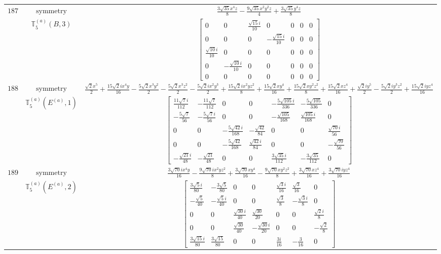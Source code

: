 \documentclass[fleqn,8pt,landscape]{jsarticle}
\begin{document}
\begin{longtable}{ccc}
$ 187 $ & $ \text{symmetry} $ & $ \frac{3 \sqrt{35} x^{4} z}{8} - \frac{9 \sqrt{35} x^{2} y^{2} z}{4} + \frac{3 \sqrt{35} y^{4} z}{8} $ \\
$  $ & $ \mathbb{T}_{5}^{(a)}(B,3) $ & $ \begin{bmatrix} 0 & 0 & \frac{\sqrt{15} i}{10} & 0 & 0 & 0 & 0 \\ 0 & 0 & 0 & - \frac{\sqrt{15} i}{10} & 0 & 0 & 0 \\ \frac{\sqrt{10} i}{10} & 0 & 0 & 0 & 0 & 0 & 0 \\ 0 & - \frac{\sqrt{10} i}{10} & 0 & 0 & 0 & 0 & 0 \\ 0 & 0 & 0 & 0 & 0 & 0 & 0 \end{bmatrix} $ \\ \hline
$ 188 $ & $ \text{symmetry} $ & $ \frac{\sqrt{2} x^{5}}{2} + \frac{15 \sqrt{2} i x^{4} y}{16} - \frac{5 \sqrt{2} x^{3} y^{2}}{2} - \frac{5 \sqrt{2} x^{3} z^{2}}{2} - \frac{5 \sqrt{2} i x^{2} y^{3}}{2} + \frac{15 \sqrt{2} i x^{2} y z^{2}}{8} + \frac{15 \sqrt{2} x y^{4}}{16} + \frac{15 \sqrt{2} x y^{2} z^{2}}{8} + \frac{15 \sqrt{2} x z^{4}}{16} + \frac{\sqrt{2} i y^{5}}{2} - \frac{5 \sqrt{2} i y^{3} z^{2}}{2} + \frac{15 \sqrt{2} i y z^{4}}{16} $ \\
$  $ & $ \mathbb{T}_{5}^{(a)}(E^{(a)},1) $ & $ \begin{bmatrix} \frac{11 \sqrt{7} i}{112} & - \frac{11 \sqrt{7}}{112} & 0 & 0 & - \frac{5 \sqrt{105} i}{336} & - \frac{5 \sqrt{105}}{336} & 0 \\ - \frac{5 \sqrt{7}}{56} & - \frac{5 \sqrt{7} i}{56} & 0 & 0 & - \frac{\sqrt{105}}{168} & \frac{\sqrt{105} i}{168} & 0 \\ 0 & 0 & - \frac{5 \sqrt{42} i}{168} & - \frac{\sqrt{42}}{84} & 0 & 0 & \frac{\sqrt{70} i}{56} \\ 0 & 0 & - \frac{5 \sqrt{42}}{168} & \frac{\sqrt{42} i}{84} & 0 & 0 & - \frac{\sqrt{70}}{56} \\ - \frac{\sqrt{21} i}{48} & - \frac{\sqrt{21}}{48} & 0 & 0 & \frac{3 \sqrt{35} i}{112} & - \frac{3 \sqrt{35}}{112} & 0 \end{bmatrix} $ \\ \hline
$ 189 $ & $ \text{symmetry} $ & $ \frac{3 \sqrt{70} i x^{4} y}{16} - \frac{9 \sqrt{70} i x^{2} y z^{2}}{8} + \frac{3 \sqrt{70} x y^{4}}{16} - \frac{9 \sqrt{70} x y^{2} z^{2}}{8} + \frac{3 \sqrt{70} x z^{4}}{16} + \frac{3 \sqrt{70} i y z^{4}}{16} $ \\
$  $ & $ \mathbb{T}_{5}^{(a)}(E^{(a)},2) $ & $ \begin{bmatrix} \frac{3 \sqrt{5} i}{80} & - \frac{3 \sqrt{5}}{80} & 0 & 0 & \frac{\sqrt{3} i}{16} & \frac{\sqrt{3}}{16} & 0 \\ - \frac{\sqrt{5}}{40} & - \frac{\sqrt{5} i}{40} & 0 & 0 & \frac{\sqrt{3}}{8} & - \frac{\sqrt{3} i}{8} & 0 \\ 0 & 0 & \frac{\sqrt{30} i}{40} & \frac{\sqrt{30}}{20} & 0 & 0 & \frac{\sqrt{2} i}{8} \\ 0 & 0 & \frac{\sqrt{30}}{40} & - \frac{\sqrt{30} i}{20} & 0 & 0 & - \frac{\sqrt{2}}{8} \\ \frac{3 \sqrt{15} i}{80} & \frac{3 \sqrt{15}}{80} & 0 & 0 & \frac{3 i}{16} & - \frac{3}{16} & 0 \end{bmatrix} $ \\ \hline

\end{longtable}
\end{document}
